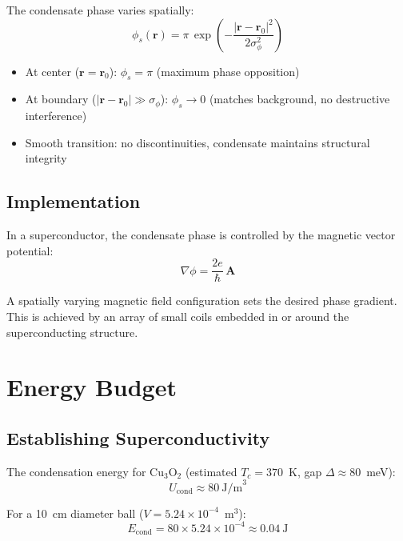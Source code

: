 \documentclass[11pt, a4paper]{article}
\begin{document}
The condensate phase varies spatially:
\begin{equation}
  \phi_s(\mathbf{r}) = \pi\,
  \exp\!\left(-\frac{|\mathbf{r} - \mathbf{r}_0|^2}
  {2\sigma_\phi^2}\right)
\end{equation}

\begin{itemize}[nosep]
  \item At center ($\mathbf{r} = \mathbf{r}_0$):
        $\phi_s = \pi$ (maximum phase opposition)
  \item At boundary ($|\mathbf{r} - \mathbf{r}_0| \gg \sigma_\phi$):
        $\phi_s \to 0$ (matches background, no destructive interference)
  \item Smooth transition: no discontinuities, condensate
        maintains structural integrity
\end{itemize}

\subsection{Implementation}

In a superconductor, the condensate phase is controlled by the
magnetic vector potential:
\begin{equation}
  \nabla\phi = \frac{2e}{\hbar}\,\mathbf{A}
\end{equation}

A spatially varying magnetic field configuration sets the
desired phase gradient. This is achieved by an array of
small coils embedded in or around the superconducting structure.

\section{Energy Budget}

\subsection{Establishing Superconductivity}

The condensation energy for Cu$_3$O$_2$ (estimated $T_c = 370$~K,
gap $\Delta \approx 80$~meV):
\begin{equation}
  U_{\text{cond}} \approx 80~\text{J/m}^3
\end{equation}

For a 10~cm diameter ball ($V = 5.24 \times 10^{-4}$~m$^3$):
\begin{equation}
  E_{\text{cond}} = 80 \times 5.24 \times 10^{-4}
  \approx 0.04~\text{J}
\end{equation}
\end{document}
